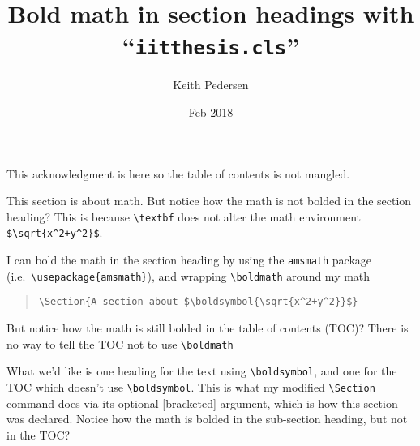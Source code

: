 \documentclass{iitthesis}
\begin{document}
\title{Bold math in section headings with ``{\tt iitthesis.cls}''}


\author{Keith Pedersen}
\degree{}
\dept{}
\date{Feb 2018}

\maketitle

\prelimpages

\begin{acknowledgement}     %
\par 
This acknowledgment is here so the table of contents is not mangled.
\end{acknowledgement}
\tableofcontents
\clearpage

\textpages


\label{sec:no-bold-in-text}

This section is about math. 
But notice how the math is not bolded in the section heading?
This is because \verb|\textbf| does not alter the math environment \verb|$\sqrt{x^2+y^2}$|.

\label{sec:bold-in-TOC}

I can bold the math in the section heading by using the {\tt amsmath} package 
(i.e.\ \verb|\usepackage{amsmath}|), and wrapping {\tt \verb|\boldmath|} around my math
\begin{quotation}
	\verb|\Section{A section about $\boldsymbol{\sqrt{x^2+y^2}}$}|
\end{quotation}
But notice how the math is still bolded in the table of contents (TOC)?
There is no way to tell the TOC not to use \verb|\boldmath|


What we'd like is one heading for the text using \verb|\boldsymbol|, 
and one for the TOC which doesn't use \verb|\boldsymbol|.
This is what my modified \verb|\Section| command does
via its optional [bracketed] argument, 
which is how this section was declared.
Notice how the math is bolded in the sub-section heading, 
but not in the TOC? 
\end{document}
